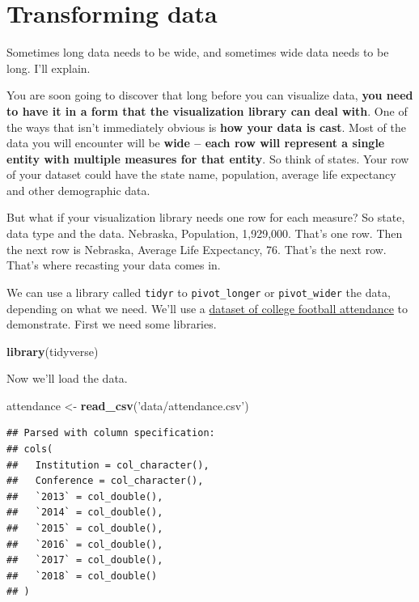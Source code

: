 \documentclass[
]{book}
\newenvironment{Shaded}{\begin{snugshade}}{\end{snugshade}}
\newcommand{\KeywordTok}[1]{\textcolor[rgb]{0.13,0.29,0.53}{\textbf{#1}}}
\newcommand{\NormalTok}[1]{#1}
\newcommand{\StringTok}[1]{\textcolor[rgb]{0.31,0.60,0.02}{#1}}
\begin{document}
\hypertarget{transforming-data}{%
\chapter{Transforming data}\label{transforming-data}}

Sometimes long data needs to be wide, and sometimes wide data needs to be long. I'll explain.

You are soon going to discover that long before you can visualize data, \textbf{you need to have it in a form that the visualization library can deal with}. One of the ways that isn't immediately obvious is \textbf{how your data is cast}. Most of the data you will encounter will be \textbf{wide -- each row will represent a single entity with multiple measures for that entity}. So think of states. Your row of your dataset could have the state name, population, average life expectancy and other demographic data.

But what if your visualization library needs one row for each measure? So state, data type and the data. Nebraska, Population, 1,929,000. That's one row. Then the next row is Nebraska, Average Life Expectancy, 76. That's the next row. That's where recasting your data comes in.

We can use a library called \texttt{tidyr} to \texttt{pivot\_longer} or \texttt{pivot\_wider} the data, depending on what we need. We'll use a \href{https://unl.box.com/s/oajabnn5614s22jstgcd9ojxo2njn6jt}{dataset of college football attendance} to demonstrate. First we need some libraries.

\begin{Shaded}
\begin{Highlighting}[]
\KeywordTok{library}\NormalTok{(tidyverse)}
\end{Highlighting}
\end{Shaded}

Now we'll load the data.

\begin{Shaded}
\begin{Highlighting}[]
\NormalTok{attendance <-}\StringTok{ }\KeywordTok{read_csv}\NormalTok{(}\StringTok{'data/attendance.csv'}\NormalTok{)}
\end{Highlighting}
\end{Shaded}

\begin{verbatim}
## Parsed with column specification:
## cols(
##   Institution = col_character(),
##   Conference = col_character(),
##   `2013` = col_double(),
##   `2014` = col_double(),
##   `2015` = col_double(),
##   `2016` = col_double(),
##   `2017` = col_double(),
##   `2018` = col_double()
## )
\end{verbatim}
\end{document}
